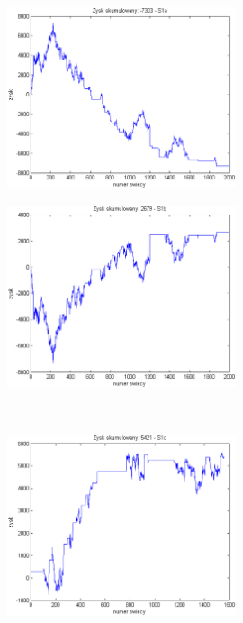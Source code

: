 \documentclass{tewiart}
\begin{document}
\FloatBarrier
\begin{figure}[h]
\centering
\begin{minipage}{\linewidth}
\centering
\includegraphics[width=0.6\textwidth]{images/usdcadS1a.eps}
\label{jedno}
\end{minipage}
\begin{minipage}{\linewidth}
\centering
\includegraphics[width=0.6\textwidth]{images/usdcadS1b.eps}
\label{dwu}
\end{minipage}
\\
\begin{minipage}{\linewidth}
\centering
\includegraphics[width=0.6\textwidth]{images/usdcadS1c.eps}

\end{minipage}
\end{figure}
\end{document}
